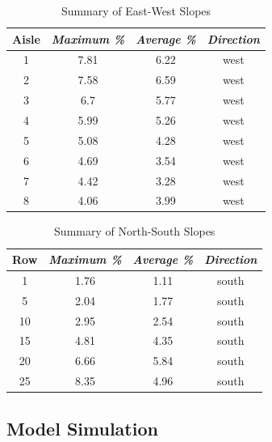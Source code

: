 \documentclass[conference]{IEEEtran}
\begin{document}
\begin{table}[htbp]
\caption{Summary of East-West Slopes}
\begin{center}
\begin{tabular}{|c|c|c|c|}
\hline
\textbf{Aisle} & \textbf{\textit{Maximum \%}}& \textbf{\textit{Average \%}}& \textbf{\textit{Direction}} \\
\hline
1& 7.81& 6.22& west \\
\hline
2& 7.58& 6.59& west \\
\hline
3& 6.7& 5.77& west \\
\hline
4&5.99& 5.26& west \\
\hline
5& 5.08& 4.28& west \\
\hline
6& 4.69& 3.54& west \\
\hline
7& 4.42& 3.28& west \\
\hline
8& 4.06& 3.99& west \\
\hline
\end{tabular}
\label{table:ew-slope-summary}
\end{center}
\end{table}

\begin{table}[htbp]
\caption{Summary of North-South Slopes}
\begin{center}
\begin{tabular}{|c|c|c|c|}
\hline
\textbf{Row} & \textbf{\textit{Maximum \%}}& \textbf{\textit{Average \%}}& \textbf{\textit{Direction}} \\
\hline
1&  1.76&  1.11& south \\
\hline
5&  2.04&  1.77& south \\
\hline
10& 2.95&  2.54& south \\
\hline
15& 4.81&  4.35& south \\
\hline
20& 6.66&  5.84& south \\
\hline
25& 8.35&  4.96& south \\
\hline
\end{tabular}
\label{table:row-slope-summary}
\end{center}
\end{table}

\subsection{Model Simulation}
\end{document}
